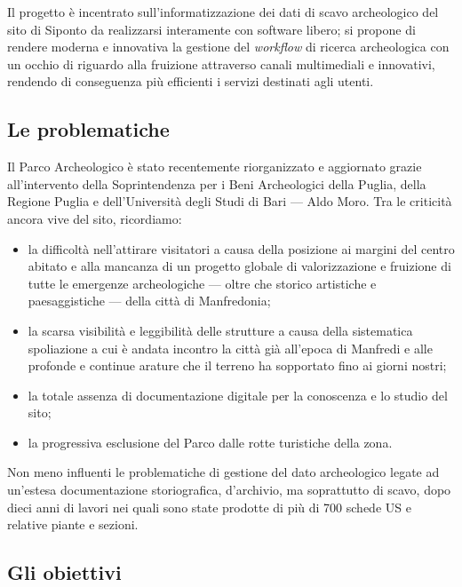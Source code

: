 \documentclass{paper}
\begin{document}
    Il progetto è incentrato sull'informatizzazione dei dati di scavo archeologico del sito di Siponto da realizzarsi interamente con software libero; si propone di rendere moderna e innovativa la gestione del \textit{workflow} di ricerca archeologica con un occhio di riguardo alla fruizione attraverso canali multimediali e innovativi, rendendo di conseguenza più efficienti i servizi destinati agli utenti. 

    \subsection{Le problematiche}

        Il Parco Archeologico è stato recentemente riorganizzato e aggiornato grazie all'intervento della Soprintendenza per i Beni Archeologici della Puglia, della Regione Puglia e dell'Università degli Studi di Bari --- Aldo Moro. Tra le criticità ancora vive del sito, ricordiamo:

        \begin{itemize}
            \item la difficoltà nell'attirare visitatori a causa della posizione ai margini del centro abitato e alla mancanza di un progetto globale di valorizzazione e fruizione di tutte le emergenze archeologiche --- oltre che storico artistiche e paesaggistiche --- della città di Manfredonia;
            \item la scarsa visibilità e leggibilità delle strutture a causa della sistematica spoliazione a cui è andata incontro la città già all'epoca di Manfredi e alle profonde e continue arature che il terreno ha sopportato fino ai giorni nostri;
            \item la totale assenza di documentazione digitale per la conoscenza e lo studio del sito;
            \item la progressiva esclusione del Parco dalle rotte turistiche della zona.
        \end{itemize}

        Non meno influenti le problematiche di gestione del dato archeologico legate ad un'estesa documentazione storiografica, d'archivio, ma soprattutto di scavo, dopo dieci anni di lavori nei quali sono state prodotte di più di 700 schede US e relative piante e sezioni.

    \subsection{Gli obiettivi}
\end{document}
